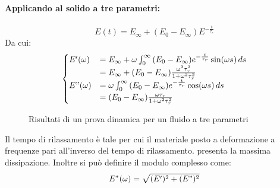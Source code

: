 \paragraph{Applicando al solido a tre parametri:}
\begin{equation}
E(t) = E_{\infty} + (E_0-E_{\infty})E^{-\frac{t}{\tau_r}}
\end{equation}
Da cui:
\begin{equation}
\begin{cases}
E'(\omega) &= E_{\infty} + \omega\int_0^{\infty}{(E_0-E_{\infty})e^{-\frac{t}{\tau_r}}\sin(\omega s)\,ds}\\
&= E_{\infty} + (E_0-E_{\infty})\frac{\omega^2\tau_r^2}{1+\omega^2\tau_r^2}\\
E"(\omega) &= \omega\int_0^{\infty}{(E_0-E_{\infty})e^{-\frac{t}{\tau_r}}\cos(\omega s)\,ds}\\
&= (E_0 - E_{\infty})\frac{\omega \tau_r}{1+\omega^2\tau_r^2}
\end{cases}
\end{equation}

\begin{figure}
\centering
{}\quad
{}
\caption{Risultati di un prova dinamica per un fluido a tre parametri}
\label{fig:3Param}
\end{figure}
Il tempo di rilassamento è tale per cui il materiale posto a deformazione a frequenze pari all'inverso del tempo di rilassamento. presenta la massima dissipazione.
Inoltre si può definire il modulo complesso come:
\begin{equation}
E^*(\omega) = \sqrt{(E')^2+(E")^2}
\end{equation}

